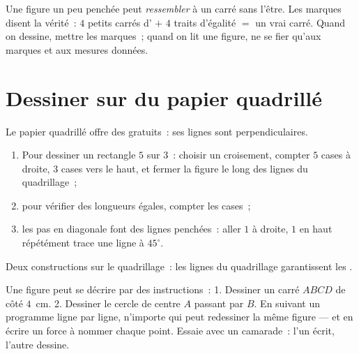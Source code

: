 \begin{example}\label{ex:g3:shapes:marks}
Une figure un peu penchée peut \emph{ressembler} à un carré
sans l'être. Les marques disent la vérité~: $4$ petits carrés
d' $+$ $4$ traits d'égalité $=$ un vrai carré.
Quand on dessine, mettre les marques~; quand on lit une figure, ne
se fier qu'aux marques et aux mesures données.
\end{example}

\section{Dessiner sur du papier quadrillé}

\begin{method}\label{met:g3:shapes:grid}
Le papier quadrillé offre des  gratuits~: ses lignes
sont perpendiculaires.
\begin{enumerate}
  \item Pour dessiner un rectangle $5$ sur $3$~: choisir un croisement,
        compter $5$ cases à droite, $3$ cases vers le haut, et
        fermer la figure le long des lignes du quadrillage~;
  \item pour vérifier des longueurs égales, compter les cases~;
  \item les pas en diagonale font des lignes penchées~: aller
        \guillemotleft{} $1$ à droite, $1$ en haut \guillemotright{}
        répétément trace une ligne à $45^\circ$.
\end{enumerate}
\end{method}

\begin{omfigure}

{\small Deux constructions sur le quadrillage~: les lignes du
quadrillage garantissent les .}
\end{omfigure}

\begin{example}\label{ex:g3:shapes:program}
Une figure peut se décrire par des instructions~:
\guillemotleft{} 1. Dessiner un carré $ABCD$ de côté $4$~cm.
2. Dessiner le cercle de centre $A$ passant par $B$.
\guillemotright{} En suivant un programme ligne par ligne, n'importe
qui peut redessiner la même figure --- et en écrire un force à
nommer chaque point. Essaie avec un camarade~: l'un écrit, l'autre
dessine.
\end{example}

